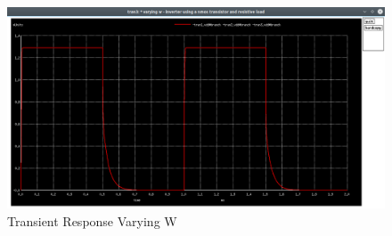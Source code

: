 \documentclass[12pt]{article}
\begin{document}
	\begin{figure}[H]
		\begin{center}
			\includegraphics[scale=0.25]{images/inverter_w_vdd.png}
			\caption{Transient Response Varying W}
			\label{fig::varying_w_vdd}
		\end{center}
	\end{figure}
	
\end{document}
